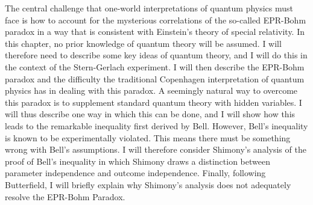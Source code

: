 \documentclass[12pt]{report}
\begin{document}
    
    The central challenge that one-world interpretations of quantum physics must face is how to account for the mysterious correlations of the so-called EPR-Bohm paradox in a way that is consistent with Einstein's theory of special relativity.  In this chapter, no  prior knowledge of quantum theory will be assumed. I will therefore need to describe some key ideas of quantum theory, and I will do this in the context of the  Stern-Gerlach experiment. 
    I will then describe the EPR-Bohm paradox and the difficulty the traditional Copenhagen interpretation of quantum physics has in dealing with this paradox. A seemingly natural way to overcome this paradox is to supplement standard quantum theory with hidden variables. I will thus describe one way in which this can be done, and I will show how this leads to the remarkable inequality first derived by Bell. However, Bell's inequality is known to be experimentally violated. This means there must be something wrong with Bell's assumptions. I will therefore consider Shimony's analysis of the proof of Bell's inequality in which Shimony draws a distinction between parameter independence and outcome independence. Finally, following Butterfield, I will briefly explain why Shimony's analysis does not adequately resolve the EPR-Bohm Paradox. 


    

\end{document}
